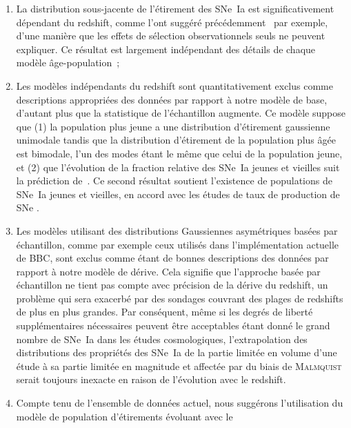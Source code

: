 \documentclass[../main/main.tex]{subfiles}
\begin{document}
\begin{enumerate}
    \item La distribution sous-jacente de l'étirement des SNe~Ia est
        significativement dépendant du redshift, comme l'ont suggéré
        précédemment~\cite{howell2007} par exemple, d'une manière que les effets
        de sélection observationnels seuls ne peuvent expliquer. Ce résultat est
        largement indépendant des détails de chaque modèle âge-population~;
    \item Les modèles indépendants du redshift sont quantitativement exclus
        comme descriptions appropriées des données par rapport à notre modèle de
        base, d'autant plus que la statistique de l'échantillon augmente. Ce
        modèle suppose que (1) la population plus jeune a une distribution
        d'étirement gaussienne unimodale tandis que la distribution d'étirement
        de la population plus âgée est bimodale, l'un des modes étant le même
        que celui de la population jeune, et (2) que l'évolution de la fraction
        relative des SNe~Ia jeunes et vieilles suit la prédiction
        de~\cite{rigault2020}. Ce second résultat soutient l'existence de
        populations de SNe~Ia jeunes et vieilles, en accord avec les études de
        taux de production de SNe \citep{mannucci2005, scannapieco2005,
        sullivan2006, aubourg2008}.
    \item Les modèles utilisant des distributions Gaussiennes asymétriques
        basées par échantillon, comme par exemple ceux utilisés dans
        l'implémentation actuelle de BBC, sont exclus comme étant de bonnes
        descriptions des données par rapport à notre modèle de dérive. Cela
        signifie que l'approche basée par échantillon ne tient pas compte avec
        précision de la dérive du redshift, un problème qui sera exacerbé par
        des sondages couvrant des plages de redshifts de plus en plus grandes.
        Par conséquent, même si les degrés de liberté supplémentaires
        nécessaires peuvent être acceptables étant donné le grand nombre de
        SNe~Ia dans les études cosmologiques, l'extrapolation des distributions
        des propriétés des SNe~Ia de la partie limitée en volume d'une
        étude à sa partie limitée en magnitude et affectée par du biais de
        \textsc{Malmquist} serait toujours inexacte en raison de l'évolution
        avec le redshift.
    \item Compte tenu de l'ensemble de données actuel, nous suggérons
        l'utilisation du modèle de population d'étirements évoluant avec le

\end{enumerate}
\end{document}
